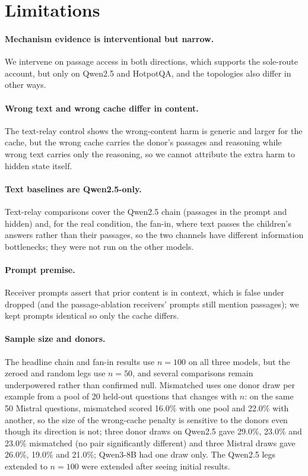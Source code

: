 \documentclass[11pt]{article}
\begin{document}
\section*{Limitations}
\label{sec:limitations}

\paragraph{Mechanism evidence is interventional but narrow.} We intervene on
passage access in both directions, which supports the sole-route account, but
only on Qwen2.5 and HotpotQA, and the topologies also differ in other ways.

\paragraph{Wrong text and wrong cache differ in content.} The text-relay
control shows the wrong-content harm is generic and larger for the cache, but the
wrong cache carries the donor's passages and reasoning while wrong text carries
only the reasoning, so we cannot attribute the extra harm to hidden state itself.

\paragraph{Text baselines are Qwen2.5-only.} Text-relay comparisons cover the
Qwen2.5 chain (passages in the prompt and hidden) and, for the real condition, the
fan-in, where text passes the
children's answers rather than their passages, so the two channels have different
information bottlenecks; they were not run on the other models.

\paragraph{Prompt premise.} Receiver prompts assert that prior content
is in context, which is false under dropped (and the passage-ablation
receivers' prompts still mention passages); we kept prompts identical so only
the cache differs.

\paragraph{Sample size and donors.} The headline chain and fan-in results use
$n{=}100$ on all three models, but the zeroed and random legs use $n{=}50$, and
several comparisons remain underpowered rather than confirmed null.
Mismatched uses one donor draw per example from a pool of 20 held-out questions
that changes with $n$: on the same 50 Mistral questions, mismatched scored 16.0\%
with one pool and 22.0\% with another, so the size of the wrong-cache penalty is
sensitive to the donors even though its direction is not; three donor draws on
Qwen2.5 gave 29.0\%, 23.0\% and 23.0\% mismatched (no pair significantly
different) and three Mistral draws gave 26.0\%, 19.0\% and 21.0\%; Qwen3-8B had
one draw only. The Qwen2.5 legs extended
to $n{=}100$ were extended after seeing initial results.
\end{document}
